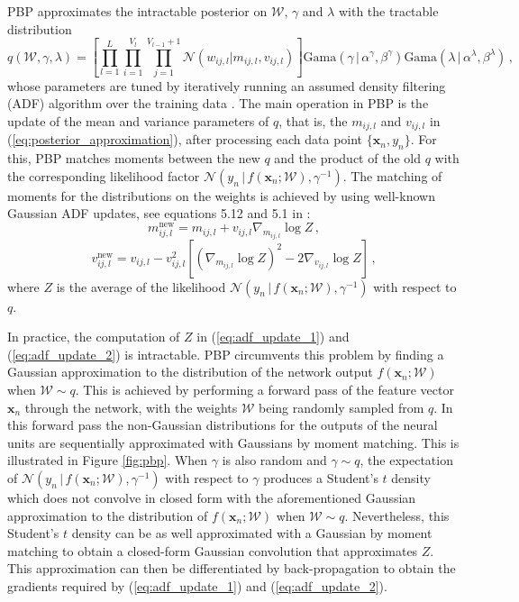 PBP approximates the intractable posterior on $\mathcal{W}$, $\gamma$ and $\lambda$ with the tractable distribution
\begin{equation}
q(\mathcal{W},\gamma, \lambda) = \left[ \prod_{l=1}^L\! \prod_{i=1}^{V_l}\! 
\prod_{j=1}^{V_{l\!-\!1}\!+\!1} \mathcal{N}(w_{ij,l}| m_{ij,l},v_{ij,l})\right ]
 \text{Gama}(\gamma \,|\, \alpha^\gamma, \beta^\gamma)
\text{Gama}(\lambda \,|\, \alpha^\lambda, \beta^\lambda)\,,\label{eq:posterior_approximation}
\end{equation}
whose parameters are tuned by iteratively running an assumed density filtering (ADF) algorithm over the training data \cite{Opper1998}. The main operation in PBP is the update of the mean and variance parameters of $q$, that is, the $m_{ij,l}$ and $v_{ij,l}$ in
(\ref{eq:posterior_approximation}), after processing each data point $\{\mathbf{x}_n,y_n\}$. For this, PBP matches moments between the new $q$ and the product of the old $q$ with the corresponding likelihood factor $\mathcal{N}(y_n \,|\, f(\mathbf{x}_n;\mathcal{W}),\gamma^{-1})$. The matching of moments for the distributions on the weights is achieved by using well-known Gaussian ADF updates, see equations 5.12 and 5.1 in \cite{minka2001family}:
\begin{equation}
\label{eq:adf_update_1} m_{ij,l}^\text{new} =  m_{ij,l} + v_{ij,l} \nabla_{m_{ij,l}} \log Z \,,
\end{equation}
\begin{equation}
\label{eq:adf_update_2}v_{ij,l}^\text{new} = v_{ij,l} - v_{ij,l}^2 \left[ (\nabla_{m_{ij,l}} \log Z)^2 - 2 \nabla_{v_{ij,l}} \log Z \right]\,,
\end{equation}
where $Z$ is the average of the likelihood $\mathcal{N}(y_n\,|\, f(\mathbf{x}_n;\mathcal{W}),\gamma^{-1})$ with respect to $q$. 

In practice, the computation of $Z$ in (\ref{eq:adf_update_1}) and (\ref{eq:adf_update_2}) is intractable. PBP circumvents this problem by finding a Gaussian approximation to the distribution of the network output $f(\mathbf{x}_n;\mathcal{W})$ when $\mathcal{W} \sim q$. This is achieved by performing a forward pass of the feature vector $\mathbf{x}_n$ through the network, with the weights $\mathcal{W}$ being randomly sampled from $q$. In this forward pass the non-Gaussian distributions for the outputs of the neural units are sequentially approximated with Gaussians by moment matching. This is illustrated in Figure \ref{fig:pbp}. When $\gamma$ is also random and $\gamma\sim q$, the expectation of $\mathcal{N}(y_n \,|\, f(\mathbf{x}_n;\mathcal{W}),\gamma^{-1})$ with respect to $\gamma$ produces a Student's $t$ density which does not convolve in closed form with the aforementioned Gaussian approximation to the distribution of $f(\mathbf{x}_n;\mathcal{W})$ when $\mathcal{W} \sim q$. Nevertheless, this Student's $t$ density can be as well approximated with a Gaussian by moment matching to obtain a closed-form Gaussian convolution that approximates $Z$. This approximation can then be differentiated by back-propagation to obtain the gradients required by (\ref{eq:adf_update_1}) and (\ref{eq:adf_update_2}).

